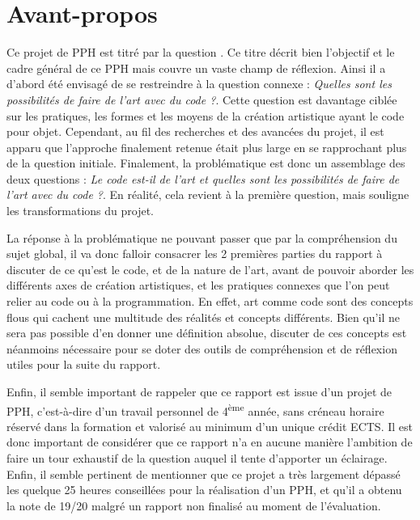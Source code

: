 \documentclass[12pt]{article} %
\newcommand{\ts}{\textsuperscript} %
\begin{document}
\section*{Avant-propos}
Ce projet de PPH est titré par la question . Ce titre décrit bien l'objectif et le cadre général de ce PPH mais couvre un vaste champ de réflexion. Ainsi il a d'abord été envisagé de se restreindre à la question connexe : \textit{Quelles sont les possibilités de faire de l'art avec du code ?}. Cette question est davantage ciblée sur les pratiques, les formes et les moyens de la création artistique ayant le code pour objet. Cependant, au fil des recherches et des avancées du projet, il est apparu que l'approche finalement retenue était plus large en se rapprochant plus de la question initiale. Finalement, la problématique est donc un assemblage des deux questions : \textit{Le code est-il de l'art et quelles sont les possibilités de faire de l'art avec du code ?}. En réalité, cela revient à la première question, mais souligne les transformations du projet.

La réponse à la problématique ne pouvant passer que par la compréhension du sujet global, il va donc falloir consacrer les 2 premières parties du rapport à discuter de ce qu'est le code, et de la nature de l'art, avant de pouvoir aborder les différents axes de création artistiques, et les pratiques connexes que l'on peut relier au code ou à la programmation. En effet, art comme code sont des concepts flous qui cachent une multitude des réalités et concepts différents. Bien qu'il ne sera pas possible d'en donner une définition absolue, discuter de ces concepts est néanmoins nécessaire pour se doter des outils de compréhension et de réflexion utiles pour la suite du rapport.

Enfin, il semble important de rappeler que ce rapport est issue d'un projet de PPH, c'est-à-dire d'un travail personnel de 4\ts{ème} année, sans créneau horaire réservé dans la formation et valorisé au minimum d'un unique crédit ECTS. Il est donc important de considérer que ce rapport n'a en aucune manière l'ambition de faire un tour exhaustif de la question auquel il tente d'apporter un éclairage. Enfin, il semble pertinent de mentionner que ce projet a très largement dépassé les quelque 25 heures conseillées pour la réalisation d'un PPH, et qu'il a obtenu la note de 19/20 malgré un rapport non finalisé au moment de l'évaluation. 

\newpage
\renewcommand{\contentsname}{Table des Matières}
\tableofcontents
\end{document}

